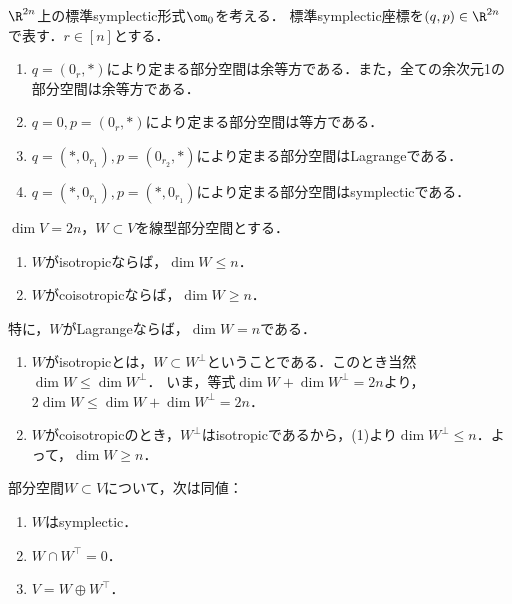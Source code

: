 \documentclass[uplatex,dvipdfmx]{jsreport}
\begin{document}
\begin{example}
    $\R^{2n}$上の標準symplectic形式$\om_0$を考える．
    標準symplectic座標を$(q,p)\in\R^{2n}$で表す．$r\in[n]$とする．
    \begin{enumerate}
        \item $q=(0_r,*)$により定まる部分空間は余等方である．また，全ての余次元1の部分空間は余等方である．
        \item $q=0,p=(0_r,*)$により定まる部分空間は等方である．
        \item $q=(*,0_{r_1}),p=(0_{r_2},*)$により定まる部分空間はLagrangeである．
        \item $q=(*,0_{r_1}),p=(*,0_{r_1})$により定まる部分空間はsymplecticである．
    \end{enumerate}
\end{example}

\begin{proposition}
    $\dim V=2n$，$W\subset V$を線型部分空間とする．
    \begin{enumerate}
        \item $W$がisotropicならば，$\dim W\le n$．
        \item $W$がcoisotropicならば，$\dim W\ge n$．
    \end{enumerate}
    特に，$W$がLagrangeならば，$\dim W=n$である．
\end{proposition}
\begin{Proof}\mbox{}
    \begin{enumerate}
        \item $W$がisotropicとは，$W\subset W^\perp$ということである．このとき当然$\dim W\le\dim W^\perp$．
        いま，等式$\dim W+\dim W^\perp=2n$より，$2\dim W\le\dim W+\dim W^\perp=2n$．
        \item $W$がcoisotropicのとき，$W^\perp$はisotropicであるから，(1)より$\dim W^\perp\le n$．よって，$\dim W\ge n$．
    \end{enumerate}
\end{Proof}

\begin{proposition}
    部分空間$W\subset V$について，次は同値：
    \begin{enumerate}
        \item $W$はsymplectic．
        \item $W\cap W^\top=0$．
        \item $V=W\oplus W^\top$．
    \end{enumerate}
\end{proposition}
\end{document}
